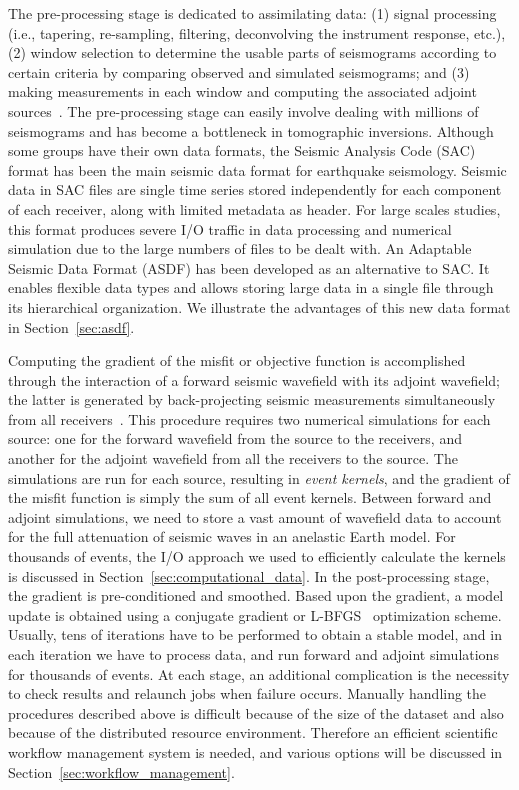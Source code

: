 The pre-processing stage is dedicated to assimilating data: (1) signal
processing (i.e., tapering, re-sampling, filtering, deconvolving the instrument
response, etc.), (2) window selection to determine the usable parts of
seismograms according to certain criteria by comparing observed and simulated
seismograms; and (3) making measurements in each window and computing
the associated adjoint sources~\cite{Tromp2005, tape2009adjoint, Zhu2009, Luo2013}. 
The pre-processing stage can easily involve dealing with millions of seismograms 
and has become a bottleneck in tomographic inversions.
Although some groups have their own data formats, the Seismic Analysis Code (SAC) format 
has been the main seismic data format for earthquake seismology. Seismic data
in SAC files are single time series stored independently for each component of each receiver, along with 
limited metadata as header. For large scales studies, this format produces
severe I/O traffic in data processing and numerical simulation due to the large
numbers of files to be dealt with.  
An Adaptable Seismic Data Format (ASDF) has been developed as an alternative 
to SAC\@. It enables flexible data types and allows storing large data in a single file 
through its hierarchical organization. We illustrate the advantages of this new data
format in Section~\ref{sec:asdf}.

Computing the gradient of the misfit or objective function is accomplished through
the interaction of a forward seismic
wavefield with its adjoint wavefield; the latter is generated by back-projecting
seismic measurements simultaneously from all receivers~\cite{Tarantola1984}.
This procedure requires two numerical
simulations for each source: one for the forward wavefield from the source to
the receivers, and another for the adjoint wavefield from all the receivers to the
source. The simulations are run for each source, resulting in \emph{event kernels},
and the gradient of the misfit function is simply the sum of all event kernels.
Between forward and adjoint simulations, we need to store a vast amount of
wavefield data to account for the full attenuation of seismic waves in an anelastic
Earth model.  
For thousands of events, the I/O approach we used to efficiently
calculate the kernels is discussed in Section~\ref{sec:computational_data}.
In the post-processing stage, the gradient is pre-conditioned and
smoothed.  Based upon the gradient, a model update is obtained using a
conjugate gradient or L-BFGS~\cite{Nocedal1980} optimization scheme. Usually,
tens of iterations have to be performed to obtain a stable model, and in each iteration
we have to process data, and run forward and adjoint simulations for thousands of
events. At each stage, an additional complication is the necessity to check
results and relaunch jobs when failure occurs. Manually handling the procedures
described above is difficult because of the size of the dataset and also because of
the distributed resource environment.
Therefore an efficient scientific workflow
management system is needed, and various options will be discussed in
Section~\ref{sec:workflow_management}.
